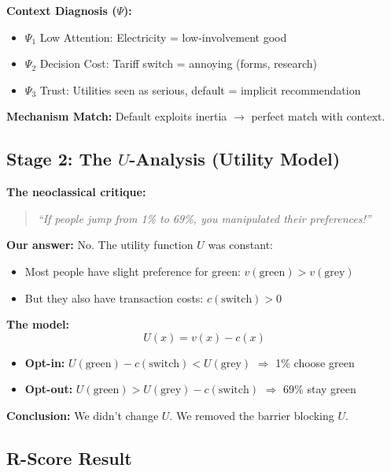 \textbf{Context Diagnosis ($\Psi$):}
\begin{itemize}[nosep]
\item $\Psi_1$ Low Attention: Electricity = low-involvement good
\item $\Psi_2$ Decision Cost: Tariff switch = annoying (forms, research)
\item $\Psi_3$ Trust: Utilities seen as serious, default = implicit recommendation
\end{itemize}

\textbf{Mechanism Match:} Default exploits inertia $\rightarrow$ perfect match with context.

\subsection{Stage 2: The $U$-Analysis (Utility Model)}

\textbf{The neoclassical critique:}
\begin{quote}
\emph{``If people jump from 1\% to 69\%, you manipulated their preferences!''}
\end{quote}

\textbf{Our answer:} No. The utility function $U$ was constant:
\begin{itemize}[nosep]
\item Most people have slight preference for green: $v(\text{green}) > v(\text{grey})$
\item But they also have transaction costs: $c(\text{switch}) > 0$
\end{itemize}

\textbf{The model:}
\begin{equation}
U(x) = v(x) - c(x)
\end{equation}

\begin{itemize}[nosep]
\item \textbf{Opt-in:} $U(\text{green}) - c(\text{switch}) < U(\text{grey})$ $\Rightarrow$ 1\% choose green
\item \textbf{Opt-out:} $U(\text{green}) > U(\text{grey}) - c(\text{switch})$ $\Rightarrow$ 69\% stay green
\end{itemize}

\textbf{Conclusion:} We didn't change $U$. We removed the barrier blocking $U$.

\subsection{R-Score Result}

